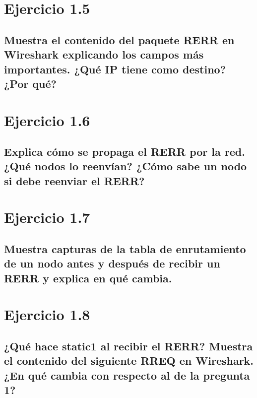 \section{Ejercicio 1.5}

\subsection{Muestra el contenido del paquete RERR en Wireshark explicando los campos más importantes. ¿Qué IP
tiene como destino? ¿Por qué?}

\section{Ejercicio 1.6}

\subsection{Explica cómo se propaga el RERR por la red. ¿Qué nodos lo reenvían? ¿Cómo sabe un nodo si debe reenviar
el RERR?}

\section{Ejercicio 1.7} 

\subsection{Muestra capturas de la tabla de enrutamiento de un nodo antes y después de recibir un RERR y explica en
qué cambia.}

\section{Ejercicio 1.8}

\subsection{¿Qué hace static1 al recibir el RERR? Muestra el contenido del siguiente RREQ en Wireshark. ¿En qué cambia
con respecto al de la pregunta 1?}